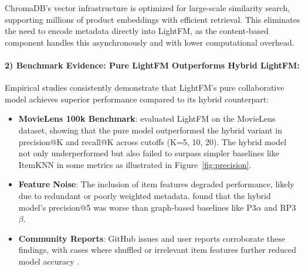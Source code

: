 ChromaDB's vector infrastructure is optimized for large-scale similarity search, supporting millions of product embeddings with efficient retrieval. This eliminates the need to encode metadata directly into LightFM, as the content-based component handles this asynchronously and with lower computational overhead.

\paragraph{2) Benchmark Evidence: Pure LightFM Outperforms Hybrid LightFM:}
Empirical studies consistently demonstrate that LightFM's pure collaborative model achieves superior performance compared to its hybrid counterpart:
\begin{itemize}
    \item \textbf{MovieLens 100k Benchmark}: \cite{shu2023lightfm} evaluated LightFM on the MovieLens dataset, showing that the pure model outperformed the hybrid variant in precision@K and recall@K across cutoffs (K=5, 10, 20). The hybrid model not only underperformed but also failed to surpass simpler baselines like ItemKNN in some metrics as illustrated in Figure~\ref{fig:precision}.

    \item \textbf{Feature Noise}: The inclusion of item features degraded performance, likely due to redundant or poorly weighted metadata. \cite{shu2023lightfm} found that the hybrid model's precision@5 was worse than graph-based baselines like P3$\alpha$ and RP3$\beta$.
    \item \textbf{Community Reports}: GitHub issues and user reports corroborate these findings, with cases where shuffled or irrelevant item features further reduced model accuracy \cite{lightfmissues}.
\end{itemize}
